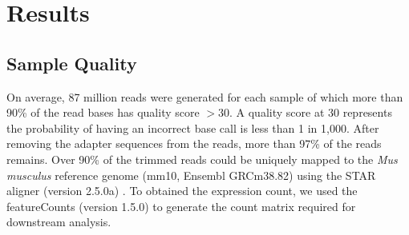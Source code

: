 \section{Results} 
\subsection{Sample Quality}
On average, 87 million reads were generated for each sample of which more than 90\% of the read bases has quality score $>30$.
A quality score at 30 represents the probability of having an incorrect base call is less than 1 in 1,000.
After removing the adapter sequences from the reads, more than 97\% of the reads remains.
Over 90\% of the trimmed reads could be uniquely mapped to the \textit{Mus musculus} reference genome (mm10, Ensembl GRCm38.82) using the STAR aligner (version 2.5.0a) \citep{Dobin2013}.
To obtained the expression count, we used the featureCounts (version 1.5.0) \citep{Liao2014} to generate the count matrix required for downstream analysis.


